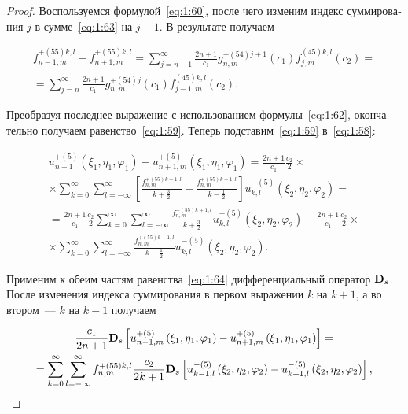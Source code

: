 \begin{russian}
\begin{proof}
Воспользуемся формулой~\eqref{eq:1:60}, после чего изменим индекс суммирования $j$ в сумме~\eqref{eq:1:63} на $j-1$. В результате получаем

\begin{multline*}
f_{n - 1,m}^{ + (55)k,l} - f_{n + 1,m}^{ + (55)k,l} = \sum\limits_{j = n - 1}^\infty  {\frac{{2n + 1}}{{{c_1}}}} g_{n,m}^{ + (54)j + 1}({c_1})f_{j,m}^{(45)k,l}({c_2}) = \\
= \sum\limits_{j = n}^\infty  {\frac{{2n + 1}}{{{c_1}}}} g_{n,m}^{ + (54)j}({c_1})f_{j - 1,m}^{(45)k,l}({c_2}).
\end{multline*}

Преобразуя последнее выражение с использованием формулы~\eqref{eq:1:62}, окончательно получаем равенство~\eqref{eq:1:59}. Теперь подставим~\eqref{eq:1:59} в~\eqref{eq:1:58}:

\begin{multline}\label{eq:1:64}
u_{n - 1}^{ + (5)}\left( {{\xi _1},{\eta _1},{\varphi _1}} \right) - u_{n + 1,m}^{ + (5)}\left( {{\xi _1},{\eta _1},{\varphi _1}} \right) = \frac{{2n + 1}}{{{c_1}}}\frac{{{c_2}}}{2} \times \\
\times \sum\limits_{k = 0}^\infty  {\sum\limits_{l =  - \infty }^\infty  {\left[ {\frac{{f_{n,m}^{ + (55)k + 1,l}}}{{k + \frac{3}{2}}} - \frac{{f_{n,m}^{ + (55)k - 1,l}}}{{k - \frac{1}{2}}}} \right]} } u_{k,l}^{ - (5)}\left( {{\xi _2},{\eta _2},{\varphi _2}} \right) = \\
= \frac{{2n + 1}}{{{c_1}}}\frac{{{c_2}}}{2}\sum\limits_{k = 0}^\infty  {\sum\limits_{l =  - \infty }^\infty  {\frac{{f_{n,m}^{ + (55)k + 1,l}}}{{k + \frac{3}{2}}}} } u_{k,l}^{ - (5)}\left( {{\xi _2},{\eta _2},{\varphi _2}} \right) - \frac{{2n + 1}}{{{c_1}}}\frac{{{c_2}}}{2} \times \\
\times \sum\limits_{k = 0}^\infty  {\sum\limits_{l =  - \infty }^\infty  {\frac{{f_{n,m}^{ + (55)k - 1,l}}}{{k - \frac{1}{2}}}} } u_{k,l}^{ - (5)}\left( {{\xi _2},{\eta _2},{\varphi _2}} \right).
\end{multline}

Применим к обеим частям равенства~\eqref{eq:1:64} дифференциальный оператор ${{\bf{D}}_s}$. После изменения индекса суммирования в первом выражении $k$ на $k+1$, а во втором~--- $k$ на $k-1$ получаем

\begin{multline*}
\frac{{{c_1}}}{{2n + 1}}{{\bf{D}}_s}\left[ {u_{n - 1,m}^{ + (5)}\left( {{\xi _1},{\eta _1},{\varphi _1}} \right) - u_{n + 1,m}^{ + (5)}\left( {{\xi _1},{\eta _1},{\varphi _1}} \right)} \right] = \\
= \sum\limits_{k = 0}^\infty  {\sum\limits_{l =  - \infty }^\infty  {f_{n,m}^{ + (55)k,l}} } \frac{{{c_2}}}{{2k + 1}}{{\bf{D}}_s}\left[ {u_{k - 1,l}^{ - (5)}\left( {{\xi _2},{\eta _2},{\varphi _2}} \right) - u_{k + 1,l}^{ - (5)}\left( {{\xi _2},{\eta _2},{\varphi _2}} \right)} \right],
\end{multline*}


\end{proof}
\end{russian}
